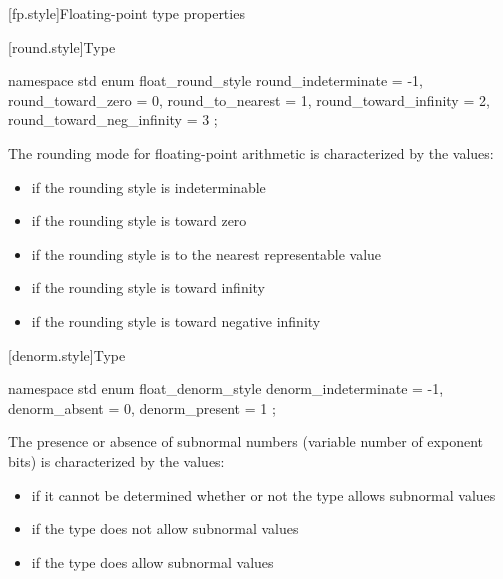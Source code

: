 [fp.style]{Floating-point type properties}

[round.style]{Type }

%
\begin{codeblock}
namespace std {
  enum float_round_style {
    round_indeterminate       = -1,
    round_toward_zero         =  0,
    round_to_nearest          =  1,
    round_toward_infinity     =  2,
    round_toward_neg_infinity =  3
  };
}
\end{codeblock}

\pnum
The rounding mode for floating-point arithmetic is characterized by the
values:

\begin{itemize}
\item
{}%
if the rounding style is indeterminable
\item
{}%
if the rounding style is toward zero
\item
{}%
if the rounding style is to the nearest representable value
\item
{}%
if the rounding style is toward infinity
\item
{}%
if the rounding style is toward negative infinity
\end{itemize}

[denorm.style]{Type }

%
\begin{codeblock}
namespace std {
  enum float_denorm_style {
    denorm_indeterminate = -1,
    denorm_absent = 0,
    denorm_present = 1
  };
}
\end{codeblock}

%
%
%
%
\pnum
The presence or absence of subnormal numbers (variable number of exponent bits)
is characterized by the values:

\begin{itemize}
\item
{}%
if it cannot be determined whether or not the type allows subnormal values
\item
{}%
if the type does not allow subnormal values
\item
{}%
if the type does allow subnormal values
\end{itemize}

